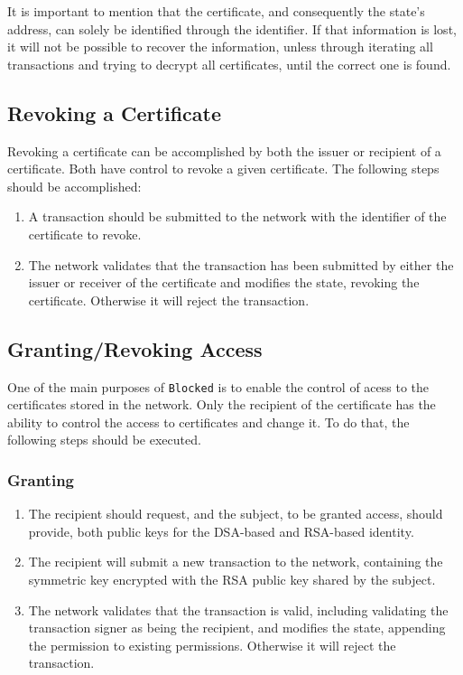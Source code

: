 It is important to mention that the certificate, and consequently the state's address, can solely be identified through the identifier. If that information is lost, it will not be possible to recover the information, unless through iterating all transactions and trying to decrypt all certificates, until the correct one is found.

\subsection{Revoking a Certificate}

Revoking a certificate can be accomplished by both the issuer or recipient of a certificate. Both have control to revoke a given certificate. The following steps should be accomplished:

\begin{enumerate}
	\item A transaction should be submitted to the network with the identifier of the certificate to revoke.
	\item The network validates that the transaction has been submitted by either the issuer or receiver of the certificate and modifies the state, revoking the certificate. Otherwise it will reject the transaction.
\end{enumerate}

\subsection{Granting/Revoking Access}

One of the main purposes of \texttt{Blocked} is to enable the control of acess to the certificates stored in the network. Only the recipient of the certificate has the ability to control the access to certificates and change it. To do that, the following steps should be executed.

\subsubsection{Granting}

\begin{enumerate}
    \item The recipient should request, and the subject, to be granted access, should provide, both public keys for the DSA-based and RSA-based identity.
    \item The recipient will submit a new transaction to the network, containing the symmetric key encrypted with the RSA public key shared by the subject.
    \item The network validates that the transaction is valid, including validating the transaction signer as being the recipient, and modifies the state, appending the permission to existing permissions. Otherwise it will reject the transaction.
\end{enumerate}

